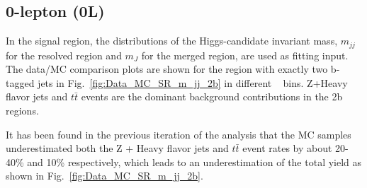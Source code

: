 \subsection{0-lepton (0L)}

\par In the signal region, the distributions of the Higgs-candidate invariant mass, $m_{jj}$ for the
 resolved region and $m_J$ for the merged region, are used as fitting input. The data/MC comparison plots are shown for the region
 with exactly two b-tagged jets in Fig.~\ref{fig:Data_MC_SR_m_jj_2b} in different \met~ bins. Z+Heavy flavor jets and $t\bar{t}$ events are the dominant background contributions in the 2b regions.
\par It has been found in the previous iteration of the analysis that the MC samples underestimated both the Z + Heavy flavor jets and
$t\bar{t}$ event rates by about 20-40\% and 10\% respectively, which leads to an underestimation of the total yield as shown in Fig.~\ref{fig:Data_MC_SR_m_jj_2b}.


